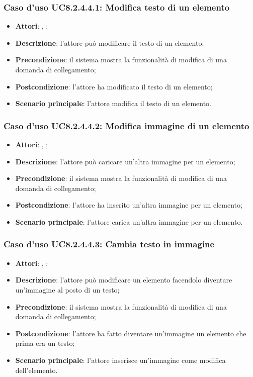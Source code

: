 		\subsubsection{Caso d'uso UC8.2.4.4.1: Modifica testo di un elemento}
		\label{UC8.2.4.4.1}
		\begin{itemize}
			\item \textbf{Attori}: \uau, \uaupro;
			\item \textbf{Descrizione}: l'attore può modificare il testo di un elemento;
			\item \textbf{Precondizione}: il sistema mostra la funzionalità di modifica di una domanda di collegamento; 
			\item \textbf{Postcondizione}: l'attore ha modificato il testo di un elemento;
			\item \textbf{Scenario principale}: l'attore modifica il testo di un elemento.  
		\end{itemize}
		
		\subsubsection{Caso d'uso UC8.2.4.4.2: Modifica immagine di un elemento}
		\label{UC8.2.4.4.2}
		\begin{itemize}
			\item \textbf{Attori}: \uau, \uaupro;
			\item \textbf{Descrizione}: l'attore può caricare un'altra immagine per un elemento;
			\item \textbf{Precondizione}: il sistema mostra la funzionalità di modifica di una domanda di collegamento; 
			\item \textbf{Postcondizione}: l'attore ha inserito un'altra immagine per un elemento;
			\item \textbf{Scenario principale}: l'attore carica un'altra immagine per un elemento.
		\end{itemize}
		
		\subsubsection{Caso d'uso UC8.2.4.4.3: Cambia testo in immagine}
		\label{UC8.2.4.4.3}
		\begin{itemize}
			\item \textbf{Attori}: \uau, \uaupro;
			\item \textbf{Descrizione}: l'attore può modificare un elemento facendolo diventare un'immagine al posto di un testo;
			\item \textbf{Precondizione}: il sistema mostra la funzionalità di modifica di una domanda di collegamento; 
			\item \textbf{Postcondizione}: l'attore ha fatto diventare un'immagine un elemento che prima era un testo;
			\item \textbf{Scenario principale}: l'attore inserisce un'immagine come modifica dell'elemento.  
		\end{itemize}
		
